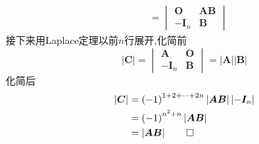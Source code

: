 \begin{formal}
\begin{Proof}
\begin{align*}
 &=
 \begin{vmatrix}
    \bm{O}&\bm{AB}\\
    -\bm{I}_n&\bm{B}
 \end{vmatrix}
\end{align*}
接下来用Laplace定理以前$n$行展开,化简前
\[
\left|\bm{C}\right|=
\begin{vmatrix}
    \bm{A}&\bm{O}\\
    -\bm{I}_n&\bm{B}
\end{vmatrix}=\left| \bm{A} \right|
 \left| \bm{B} \right|
\]
化简后
\begin{align*}
\left| 
    \bm{C}
    \right|
    &=
    \left( -1 \right) ^{1+2+\cdots+2n}
        \left|\bm{AB}\right|
        \left|-\bm{I}_n\right|\\
&=\left(-1\right)^{n^2+n}\left|\bm{AB}\right|\\
&=\left|\bm{AB}\right|
\qedhere
\end{align*}
\end{Proof}
\end{formal}
